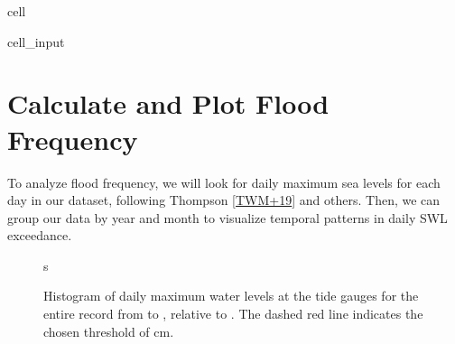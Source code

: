 \documentclass[letterpaper,10pt,english]{jupyterBook}
\begin{document}
\begin{sphinxuseclass}{cell}\begin{sphinxVerbatimInput}

\begin{sphinxuseclass}{cell_input}
\begin{sphinxVerbatim}[commandchars=\\\{\}]
\PYG{p}{[}\PYG{p}{]}  \PYG{p}{[}\PYG{p}{]}
\PYG{p}{[}\PYG{p}{]}  \PYG{p}{[}\PYG{p}{]}
\end{sphinxVerbatim}

\end{sphinxuseclass}\end{sphinxVerbatimInput}

\end{sphinxuseclass}

\chapter{Calculate and Plot Flood Frequency}
\label{\detokenize{notebooks/FloodFrequency:calculate-and-plot-flood-frequency}}
\sphinxAtStartPar
To analyze flood frequency, we will look for daily maximum sea levels for each day in our dataset, following Thompson  {[}\hyperlink{cite.notebooks/FloodFrequency:id4}{TWM+19}{]} and others. Then, we can group our data by year and month to visualize temporal patterns in daily SWL exceedance.

\begin{figure}[htbp]
\centering
\capstart

\noindent{}
\caption{Histogram of daily maximum water levels at the  tide gauges for the entire record from  to , relative to . The dashed red line indicates the chosen threshold of  cm.}\label{\detokenize{notebooks/FloodFrequency:fig-histogram}}
\begin{sphinxlegend}
\sphinxAtStartPar
s
\end{sphinxlegend}
\end{figure}
\end{document}
